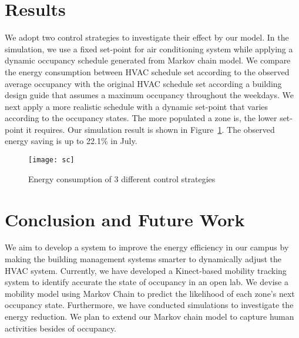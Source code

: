 \documentclass{sig-alternate}
\begin{document}
\section{Results}
\label{sec:results}
We adopt two control strategies to investigate their effect by our model. In the simulation, we use a fixed set-point for air conditioning system while applying a dynamic occupancy schedule generated from Markov chain model. We compare the energy consumption between HVAC schedule set according to the observed average occupancy with the original HVAC schedule set according a building design guide that assumes a maximum occupancy throughout the weekdays. We next apply a more realistic schedule with a dynamic set-point that varies according to the occupancy states. The more populated a zone is, the lower set-point it requires. Our simulation result is shown in Figure~\ref{fig:energy-consumption}. The observed energy saving is up to 22.1\% in July. 



\begin{figure}[!tb]
  \hspace{-20pt}
  \texttt{[image: sc]}
  \caption{Energy consumption of 3 different control strategies}
  \label{fig:energy-consumption}
\end{figure}









\section{Conclusion and Future Work}
\label{sec:concl-future-work}

We aim to develop a system to improve the energy efficiency in our campus by making the building management systems smarter to dynamically adjust the HVAC system. Currently, we have developed a Kinect-based mobility tracking system to identify accurate the state of occupancy in an open lab. We devise a mobility model using Markov Chain to predict the likelihood of each zone's next occupancy state. Furthermore, we have conducted simulations to investigate the energy reduction. We plan to extend our Markov chain model to capture human activities besides of occupancy. 









\end{document}
